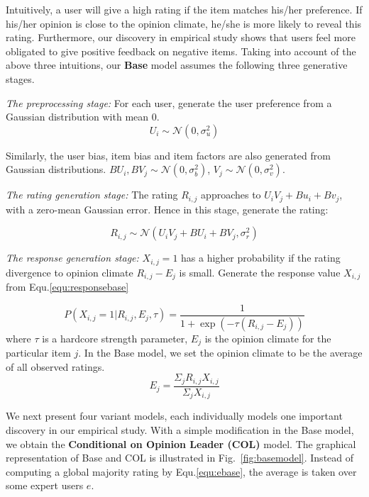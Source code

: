 \documentclass[sigconf]{acmart}
\begin{document}
Intuitively, a user will give a high rating if the item matches his/her preference. If his/her opinion is close to the opinion climate, he/she is more likely to reveal this rating. Furthermore, our  discovery in  empirical study shows that users feel more obligated to give positive feedback on negative items. Taking into account of the above three intuitions, our \textbf{Base} model assumes the following three generative stages.

\textit{The preprocessing stage:} For each user, generate the user preference from a Gaussian distribution with mean $0$.
\begin{equation}\label{equ:preferencebase}
U_i \sim \mathcal{N}(0,\sigma_u^2)
\end{equation}

Similarly, the user bias, item bias and item factors are also generated from Gaussian distributions. $BU_i, BV_j \sim \mathcal{N}(0,\sigma_b^2)$,  $V_j \sim \mathcal{N}(0,\sigma_v^2)$.

\textit{The rating generation stage:} The rating $R_{i,j}$ approaches to $U_iV_j+Bu_i + Bv_j $, with a  zero-mean Gaussian error. Hence in this stage, generate the rating: 

\begin{equation}\label{equ:rating}
R_{i,j} \sim \mathcal{N}(U_iV_j+BU_i+BV_j, \sigma_r^2)
\end{equation}

\textit{The response generation stage:} $X_{i,j}=1$ has a higher probability if the rating divergence to opinion climate $R_{i,j}-E_j$ is small. Generate the response value $X_{i,j}$ from Equ.\ref{equ:responsebase}

\begin{equation}\label{equ:responsebase}
 P(X_{i,j}=1|R_{i,j},E_j,\tau)=\frac{1}{1+\exp{(-\tau(R_{i,j}-E_j))}}
\end{equation}
 where $\tau$ is a hardcore strength parameter, $E_j$ is the opinion climate for the particular item $j$. In the Base model, we set the opinion climate to be the average of all observed ratings.
\begin{equation}\label{equ:ebase}
 E_j=\frac{\Sigma_jR_{i,j}X_{i,j}}{\Sigma_j X_{i,j}}
\end{equation}


We next present four variant models, each individually models one important discovery in our empirical study. With a simple modification in the Base model, we obtain the \textbf{Conditional on Opinion Leader (COL)} model. The graphical representation of Base and COL is illustrated in Fig.~\ref{fig:basemodel}. Instead of computing a global majority rating by Equ.\ref{equ:ebase}, the average is taken over some expert users $e$.
\end{document}
